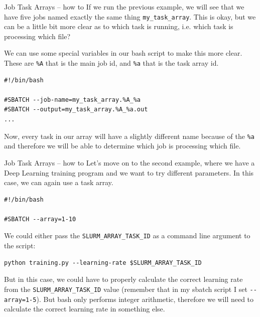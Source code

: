 \documentclass[10pt]{beamer}
\begin{document}
\begin{frame}[label={sec:orga50c68d},fragile]{Job Task Arrays -- how to}
 If we run the previous example, we will see that we have five jobs named exactly
the same thing \texttt{my\_task\_array}. This is okay, but we can be a little bit more
clear as to which task is running, i.e. which task is processing which file?

We can use some special variables in our bash script to make this more
clear. These are \texttt{\%A} that is the main job id, and \texttt{\%a} that is the task array id.

\begin{verbatim}
#!/bin/bash

#SBATCH --job-name=my_task_array.%A_%a
#SBATCH --output=my_task_array.%A_%a.out
...
\end{verbatim}

Now, every task in our array will have a slightly different name because of the
\texttt{\%a} and therefore we will be able to determine which job is processing which
file.
\end{frame}

\begin{frame}[label={sec:orgb44757c},fragile]{Job Task Arrays -- how to}
 Let's move on to the second example, where we have a Deep Learning training
program and we want to try different parameters. In this case, we can again use
a task array.

\begin{verbatim}
#!/bin/bash

#SBATCH --array=1-10
\end{verbatim}

We could either pass the \texttt{SLURM\_ARRAY\_TASK\_ID} as a command line argument to the
script:

\begin{verbatim}
python training.py --learning-rate $SLURM_ARRAY_TASK_ID
\end{verbatim}

But in this case, we could have to properly calculate the correct learning rate
from the \texttt{SLURM\_ARRAY\_TASK\_ID} value (remember that in my sbatch script I set
\texttt{-{}-array=1-5}). But bash only performs integer arithmetic, therefore we will need
to calculate the correct learning rate in something else.
\end{frame}
\end{document}
